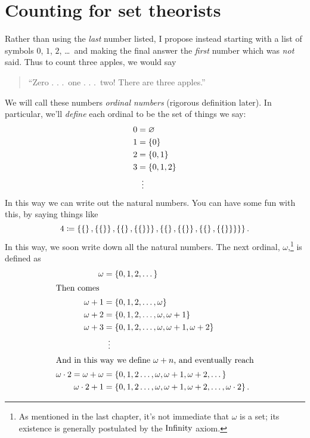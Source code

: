 \section{Counting for set theorists}
Rather than using the \emph{last} number listed, I propose instead
starting with a list of symbols $0$, $1$, $2$, \dots\ and making
the final answer the \emph{first} number which was \emph{not} said.
Thus to count three apples, we would say
\begin{quote}
	``Zero . . .\ one . . .\ two!  There are three apples.''
\end{quote}
We will call these numbers \emph{ordinal numbers} (rigorous definition later).
In particular, we'll \emph{define} each ordinal to be the set of things we say:
\begin{align*}
	0 &= \varnothing \\
	1 &= \{0\} \\
	2 &= \{0,1\} \\
	3 &= \{0,1,2\} \\
	&\vdotswithin=
\end{align*}
In this way we can write out the natural numbers.
You can have some fun with this, by saying things like
\[
	4 \coloneqq
	\left\{
		\left\{  \right\},
		\left\{ \left\{  \right\} \right\},
		\left\{ \left\{  \right\}, \left\{ \left\{  \right\} \right\} \right\},
		\left\{
			\left\{  \right\},
			\left\{ \left\{  \right\} \right\},
			\left\{ \left\{  \right\}, \left\{ \left\{  \right\} \right\} \right\}
		\right\}
	\right\}.
\]
In this way, we soon write down all the natural numbers.
The next ordinal, $\omega$,\footnote{As mentioned in the last chapter,
	it's not immediate that $\omega$ is a set;
	its existence is generally postulated by the $\mathrm{Infinity}$ axiom.
} is defined as
\begin{align*}
	\omega &= \left\{ 0, 1, 2, \dots \right\} \\
	\intertext{Then comes}
	\omega+1 &= \left\{ 0, 1, 2, \dots, \omega \right\} \\
	\omega+2 &= \left\{ 0, 1, 2, \dots, \omega, \omega+1 \right\} \\
	\omega+3 &= \left\{ 0, 1, 2, \dots, \omega, \omega+1, \omega+2 \right\} \\
	&\vdotswithin= \\
	\intertext{And in this way we define $\omega+n$, and eventually reach}
	\omega \cdot 2 = \omega+\omega &= \left\{ 0, 1, 2 \dots, \omega, \omega+1, \omega+2, \dots \right\} \\
	\omega \cdot 2 + 1 &= \left\{ 0, 1, 2 \dots, \omega, \omega+1, \omega+2, \dots, \omega \cdot 2 \right\}.
\end{align*}
